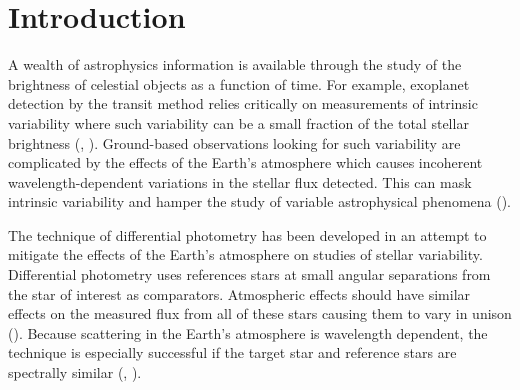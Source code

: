 \documentclass[preprint, 3p,
authoryear]{elsarticle} %
\begin{document}
\hypertarget{introduction}{%
\section{Introduction}\label{introduction}}

A wealth of astrophysics information is available through the study of
the brightness of celestial objects as a function of time. For example,
exoplanet detection by the transit method relies critically on
measurements of intrinsic variability where such variability can be a
small fraction of the total stellar brightness (\citet{Giltinan2011},
\citet{Everett2001}). Ground-based observations looking for such
variability are complicated by the effects of the Earth's atmosphere
which causes incoherent wavelength-dependent variations in the stellar
flux detected. This can mask intrinsic variability and hamper the study
of variable astrophysical phenomena (\citet{Smith2008}).

The technique of differential photometry has been developed in an
attempt to mitigate the effects of the Earth's atmosphere on studies of
stellar variability. Differential photometry uses references stars at
small angular separations from the star of interest as comparators.
Atmospheric effects should have similar effects on the measured flux
from all of these stars causing them to vary in unison
(\citet{Burdanov2014}). Because scattering in the Earth's atmosphere is
wavelength dependent, the technique is especially successful if the
target star and reference stars are spectrally similar
(\citet{Milone2011a}, \citet{Sterken2011}).
\end{document}
